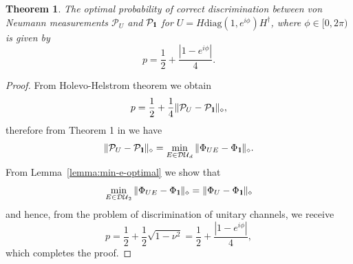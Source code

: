 \documentclass[preprint,12pt, a4paper]{elsarticle}
\newcommand{\1}{{\rm 1\hspace{-0.9mm}l}}
\newcommand{\Id}{{\rm 1\hspace{-0.9mm}l}}
\newcommand{\PP}{\mathcal{P}}
\newcommand{\diaguni}{\ensuremath{\mathcal{DU}}}
\newcommand{\diag}{\mathrm{diag}}
\newtheorem{theorem}{Theorem}
\begin{document}
\begin{theorem}
The optimal probability of correct discrimination between von Neumann
measurements $\PP_U$ and $\PP_{\Id}$ for $U = H \diag(1, e^{i \phi}) H^\dagger$,
where $\phi \in [0, 2\pi)$ is given by
\begin{equation}
p = \frac{1}{2} + \frac{|1 - e^{i \phi}  |}{4} . 
\end{equation}
\end{theorem}
\begin{proof}
	From Holevo-Helstrom theorem we obtain
	\begin{equation}
	p = \frac{1}{2} + \frac{1}{4} \| \PP_{U} - \PP_{\Id} \|_\diamond,
	\end{equation}
	therefore from Theorem 1 in \cite{puchala2018strategies} we have 
	\begin{equation}
	\|\PP_U - \PP_\Id\|_\diamond = \min_{E \in \diaguni_d} \|\Phi_{UE} - 
	\Phi_\Id\|_\diamond. 
	\end{equation}
	From Lemma~\ref{lemma:min-e-optimal} we show that 
	\begin{equation}
		\min_{E \in \diaguni_2} \|\Phi_{UE} - 
	\Phi_\Id\|_\diamond = \|\Phi_{U} - 
	\Phi_\Id\|_\diamond
	\end{equation} and hence, from the problem of discrimination of unitary channels, we receive 
	\begin{equation}
	p = \frac{1}{2} + \frac{1}{2} \sqrt{1 - \nu^2} = \frac{1}{2} + \frac{|1-e^{i \phi}|}{4},
	\end{equation} which completes the proof.
\end{proof}
\end{document}
